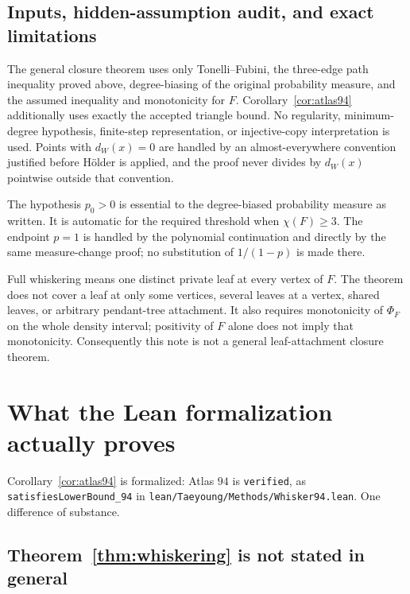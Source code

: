 \documentclass[11pt]{article}
\begin{document}
\subsection{Inputs, hidden-assumption audit, and exact limitations}

The general closure theorem uses only Tonelli--Fubini, the three-edge
path inequality proved above, degree-biasing of the original probability
measure, and the assumed inequality and monotonicity for $F$.
Corollary~\ref{cor:atlas94} additionally uses exactly the accepted
triangle bound.  No regularity, minimum-degree hypothesis, finite-step
representation, or injective-copy interpretation is used.  Points with
$d_W(x)=0$ are handled by an almost-everywhere convention justified
before H\"older is applied, and the proof never divides by $d_W(x)$
pointwise outside that convention.

The hypothesis $p_0>0$ is essential to the degree-biased probability
measure as written.  It is automatic for the required threshold when
$\chi(F)\ge3$.  The endpoint $p=1$ is handled by the polynomial
continuation and directly by the same measure-change proof; no
substitution of $1/(1-p)$ is made there.

Full whiskering means one distinct private leaf at every vertex of
$F$.  The theorem does not cover a leaf at only some vertices, several
leaves at a vertex, shared leaves, or arbitrary pendant-tree attachment.
It also requires monotonicity of $\Phi_F$ on the whole density interval;
positivity of $F$ alone does not imply that monotonicity.  Consequently
this note is not a general leaf-attachment closure theorem.

\appendix
\section{What the Lean formalization actually proves}

Corollary~\ref{cor:atlas94} is formalized: Atlas $94$ is \texttt{verified},
as \texttt{satisfiesLowerBound\_94} in
\texttt{lean/Taeyoung/Methods/Whisker94.lean}.  One difference of substance.

\subsection*{Theorem~\ref{thm:whiskering} is not stated in general}
\end{document}
